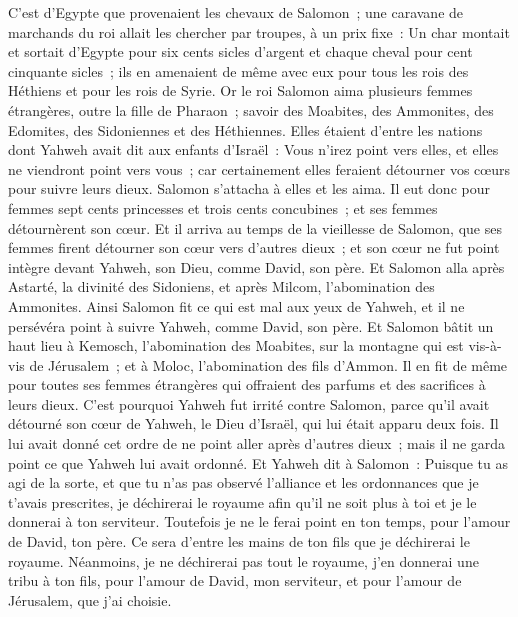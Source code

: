 \begin{multicols}{2}
C'est d'Egypte que provenaient les chevaux de Salomon~; une caravane de marchands du roi allait les chercher par troupes, à un prix fixe~:
Un char montait et sortait d'Egypte pour six cents sicles d'argent et chaque cheval pour cent cinquante sicles~; ils en amenaient de même avec eux pour tous les rois des Héthiens et pour les rois de Syrie.
\VerseOne{}Or le roi Salomon aima plusieurs femmes étrangères, outre la fille de Pharaon~; savoir des Moabites, des Ammonites, des Edomites, des Sidoniennes et des Héthiennes.
Elles étaient d'entre les nations dont Yahweh avait dit aux enfants d'Israël~: Vous n'irez point vers elles, et elles ne viendront point vers vous~; car certainement elles feraient détourner vos cœurs pour suivre leurs dieux. Salomon s'attacha à elles et les aima.
Il eut donc pour femmes sept cents princesses et trois cents concubines~; et ses femmes détournèrent son cœur.
Et il arriva au temps de la vieillesse de Salomon, que ses femmes firent détourner son cœur vers d'autres dieux~; et son cœur ne fut point intègre devant Yahweh, son Dieu, comme David, son père.
Et Salomon alla après Astarté, la divinité des Sidoniens, et après Milcom, l'abomination des Ammonites.
Ainsi Salomon fit ce qui est mal aux yeux de Yahweh, et il ne persévéra point à suivre Yahweh, comme David, son père.
Et Salomon bâtit un haut lieu à Kemosch, l'abomination des Moabites, sur la montagne qui est vis-à-vis de Jérusalem~; et à Moloc, l'abomination des fils d'Ammon.
Il en fit de même pour toutes ses femmes étrangères qui offraient des parfums et des sacrifices à leurs dieux.
C'est pourquoi Yahweh fut irrité contre Salomon, parce qu'il avait détourné son cœur de Yahweh, le Dieu d'Israël, qui lui était apparu deux fois.
Il lui avait donné cet ordre de ne point aller après d'autres dieux~; mais il ne garda point ce que Yahweh lui avait ordonné.
Et Yahweh dit à Salomon~: Puisque tu as agi de la sorte, et que tu n'as pas observé l'alliance et les ordonnances que je t'avais prescrites, je déchirerai le royaume afin qu'il ne soit plus à toi et je le donnerai à ton serviteur.
Toutefois je ne le ferai point en ton temps, pour l'amour de David, ton père. Ce sera d'entre les mains de ton fils que je déchirerai le royaume.
Néanmoins, je ne déchirerai pas tout le royaume, j'en donnerai une tribu à ton fils, pour l'amour de David, mon serviteur, et pour l'amour de Jérusalem, que j'ai choisie.

\end{multicols}
